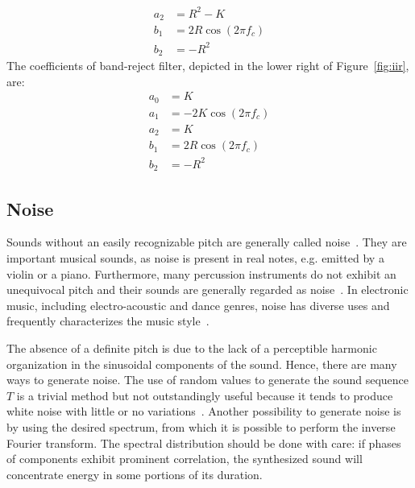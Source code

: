 \begin{enumerate}
\begin{equation}
\begin{split}
 a_2 & =  R^2-K \\
 b_1 & =  2R \cos (2\pi f_c) \\
 b_2 & =  -R^2
 \end{split}
\end{equation}
The coefficients of band-reject filter, depicted in the lower right of Figure~\ref{fig:iir}, are:
\begin{equation}\label{eq:rejeita-banda}
 \begin{split}
 a_0 & =  K \\
 a_1 & =  -2K\cos (2\pi f_c) \\
 a_2 & =  K \\
 b_1 & =  2R \cos (2\pi f_c) \\
 b_2 & =  -R^2
\end{split}
\end{equation}
\end{enumerate}

\subsection{Noise}\label{subsec:ruidos}
Sounds without an easily recognizable pitch are generally called noise~\cite{Lacerda}. They are important musical sounds, as noise is present in real notes, e.g. emitted by a violin or a piano. Furthermore, many percussion instruments do not exhibit an unequivocal pitch and their sounds are generally regarded as noise~\cite{Roederer}. In electronic music, including electro-acoustic and dance genres, noise has diverse uses and frequently characterizes the music style~\cite{Cook}. 

The absence of a definite pitch is due to the lack of a perceptible harmonic organization in the sinusoidal components of the sound.
Hence, there are many ways to generate noise. The use of random values to generate the sound sequence $T$ is a trivial method but not outstandingly useful because it tends to produce white noise with little or no variations~\cite{Cook}. Another possibility to generate noise is by using the desired spectrum, from which it is possible to perform the inverse Fourier transform. The spectral distribution should be done with care: if phases of components exhibit prominent correlation, the synthesized sound will concentrate energy in some portions of its duration.

